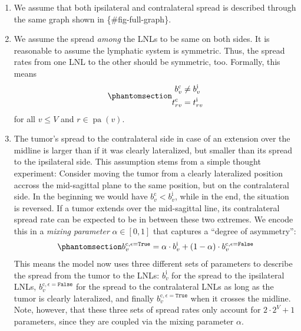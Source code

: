 \documentclass[
  sn-mathphys-num,
]{sn-jnl}
\providecommand{\tightlist}{%
  \setlength{\itemsep}{0pt}\setlength{\parskip}{0pt}}\usepackage{longtable,booktabs,array}
\begin{document}
\begin{enumerate}
\def\labelenumi{\arabic{enumi}.}
\tightlist
\item
  We assume that both ipsilateral and contralateral spread is described
  through the same graph shown in \{\#fig-full-graph\}.
\item
  We assume the spread \emph{among} the LNLs to be same on both sides.
  It is reasonable to assume the lymphatic system is symmetric. Thus,
  the spread rates from one LNL to the other should be symmetric, too.
  Formally, this means\\
  \begin{equation}\phantomsection\label{eq-symmetries}{
  \begin{aligned}
  b_v^\text{c} &\neq b_v^\text{i} \\
  t_{rv}^\text{c} &= t_{rv}^\text{i}
  \end{aligned}
  }\end{equation} for all \(v \leq V\) and
  \(r \in \operatorname{pa}(v)\).
\item
  The tumor's spread to the contralateral side in case of an extension
  over the midline is larger than if it was clearly lateralized, but
  smaller than its spread to the ipsilateral side. This assumption stems
  from a simple thought experiment: Consider moving the tumor from a
  clearly lateralized position accross the mid-sagittal plane to the
  same position, but on the contralateral side. In the beginning we
  would have \(b_v^\text{c} < b_v^\text{i}\), while in the end, the
  situation is reversed. If a tumor extends over the mid-sagittal line,
  its contralateral spread rate can be expected to be in between these
  two extremes. We encode this in a \emph{mixing parameter}
  \(\alpha \in [0,1]\) that captures a ``degree of asymmetry'':\\
  \begin{equation}\phantomsection\label{eq-mixing}{
  b_v^{\text{c},\epsilon=\texttt{True}} = \alpha \cdot b_v^\text{i} + (1 - \alpha) \cdot b_v^{\text{c},\epsilon=\texttt{False}}
  }\end{equation} This means the model now uses three different sets of
  parameters to describe the spread from the tumor to the LNLs:
  \(b^\text{i}_v\) for the spread to the ipsilateral LNLs,
  \(b_v^{\text{c},\epsilon=\texttt{False}}\) for the spread to the
  contralateral LNLs as long as the tumor is clearly lateralized, and
  finally \(b_v^{\text{c},\epsilon=\texttt{True}}\) when it crosses the
  midline. Note, however, that these three sets of spread rates only
  account for \(2 \cdot 2^V + 1\) parameters, since they are coupled via
  the mixing parameter \(\alpha\).
\end{enumerate}
\end{document}
